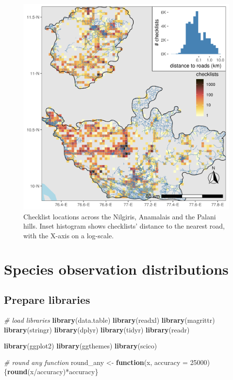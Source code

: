 \documentclass[]{article}
\newenvironment{Shaded}{}{}
\newcommand{\CommentTok}[1]{\textcolor[rgb]{0.38,0.63,0.69}{\textit{#1}}}
\newcommand{\ControlFlowTok}[1]{\textcolor[rgb]{0.00,0.44,0.13}{\textbf{#1}}}
\newcommand{\DataTypeTok}[1]{\textcolor[rgb]{0.56,0.13,0.00}{#1}}
\newcommand{\DecValTok}[1]{\textcolor[rgb]{0.25,0.63,0.44}{#1}}
\newcommand{\KeywordTok}[1]{\textcolor[rgb]{0.00,0.44,0.13}{\textbf{#1}}}
\newcommand{\NormalTok}[1]{#1}
\newcommand{\OperatorTok}[1]{\textcolor[rgb]{0.40,0.40,0.40}{#1}}
\newcommand{\StringTok}[1]{\textcolor[rgb]{0.25,0.44,0.63}{#1}}
\begin{document}
\begin{figure}
\centering
\includegraphics{figs/fig_distRoads.png}
\caption{Checklist locations across the Nilgiris, Anamalais and the Palani hills. Inset histogram shows checklists' distance to the nearest road, with the X-axis on a log-scale.}
\end{figure}

\hypertarget{species-observation-distributions}{%
\section{Species observation distributions}\label{species-observation-distributions}}

\hypertarget{prepare-libraries-1}{%
\subsection{Prepare libraries}\label{prepare-libraries-1}}

\begin{Shaded}
\begin{Highlighting}[]
\CommentTok{# load libraries}
\KeywordTok{library}\NormalTok{(data.table)}
\KeywordTok{library}\NormalTok{(readxl)}
\KeywordTok{library}\NormalTok{(magrittr)}
\KeywordTok{library}\NormalTok{(stringr)}
\KeywordTok{library}\NormalTok{(dplyr)}
\KeywordTok{library}\NormalTok{(tidyr)}
\KeywordTok{library}\NormalTok{(readr)}

\KeywordTok{library}\NormalTok{(ggplot2)}
\KeywordTok{library}\NormalTok{(ggthemes)}
\KeywordTok{library}\NormalTok{(scico)}

\CommentTok{# round any function}
\NormalTok{round_any <-}\StringTok{ }\ControlFlowTok{function}\NormalTok{(x, }\DataTypeTok{accuracy =} \DecValTok{25000}\NormalTok{)\{}\KeywordTok{round}\NormalTok{(x}\OperatorTok{/}\NormalTok{accuracy)}\OperatorTok{*}\NormalTok{accuracy\}}
\end{Highlighting}
\end{Shaded}
\end{document}

